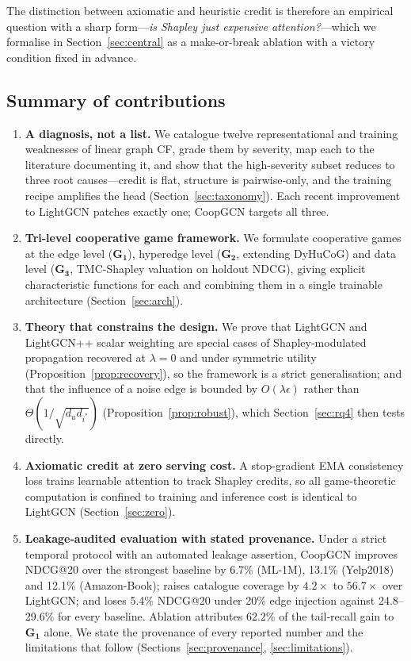 \documentclass[final,5p,times,twocolumn]{elsarticle}
\begin{document}
The distinction between axiomatic and heuristic credit is therefore an
empirical question with a sharp form---\emph{is Shapley just expensive
attention?}---which we formalise in Section~\ref{sec:central} as a
make-or-break ablation with a victory condition fixed in advance.

\subsection{Summary of contributions}
\label{sec:contrib}

\begin{enumerate}
\item \textbf{A diagnosis, not a list.} We catalogue twelve representational
and training weaknesses of linear graph CF, grade them by severity, map each
to the literature documenting it, and show that the high-severity subset
reduces to three root causes---credit is flat, structure is pairwise-only, and
the training recipe amplifies the head (Section~\ref{sec:taxonomy}). Each
recent improvement to LightGCN patches exactly one; CoopGCN targets all three.

\item \textbf{Tri-level cooperative game framework.} We formulate cooperative
games at the edge level ($\mathbf{G_1}$), hyperedge level ($\mathbf{G_2}$,
extending DyHuCoG) and data level ($\mathbf{G_3}$, TMC-Shapley valuation on
holdout NDCG), giving explicit characteristic functions for each and combining
them in a single trainable architecture (Section~\ref{sec:arch}).

\item \textbf{Theory that constrains the design.} We prove that LightGCN and
LightGCN++ scalar weighting are special cases of Shapley-modulated propagation
recovered at $\lambda = 0$ and under symmetric utility
(Proposition~\ref{prop:recovery}), so the framework is a strict
generalisation; and that the influence of a noise edge is bounded by
$O(\lambda\epsilon)$ rather than $\Theta(1/\sqrt{d_u d_{i^\ast}})$
(Proposition~\ref{prop:robust}), which Section~\ref{sec:rq4} then tests
directly.

\item \textbf{Axiomatic credit at zero serving cost.} A stop-gradient EMA
consistency loss trains learnable attention to track Shapley credits, so all
game-theoretic computation is confined to training and inference cost is
identical to LightGCN (Section~\ref{sec:zero}).

\item \textbf{Leakage-audited evaluation with stated provenance.} Under a
strict temporal protocol with an automated leakage assertion, CoopGCN improves
NDCG@20 over the strongest baseline by 6.7\% (ML-1M), 13.1\% (Yelp2018) and
12.1\% (Amazon-Book); raises catalogue coverage by $4.2\times$ to $56.7\times$
over LightGCN; and loses 5.4\% NDCG@20 under 20\% edge injection against
24.8--29.6\% for every baseline. Ablation attributes 62.2\% of the tail-recall
gain to $\mathbf{G_1}$ alone. We state the provenance of every reported number
and the limitations that follow (Sections~\ref{sec:provenance},
\ref{sec:limitations}).
\end{enumerate}
\end{document}
